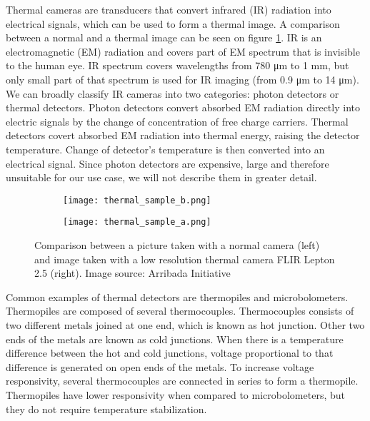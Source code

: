 Thermal cameras are transducers that convert infrared (IR) radiation into electrical signals, which can be used to form a thermal image.
A comparison between a normal and a thermal image can be seen on figure \ref{thermal_comparison}.
IR is an electromagnetic (EM) radiation and covers part of EM spectrum that is invisible to the human eye.
IR spectrum covers wavelengths from 780 \si{\micro\meter} to 1 \si{\milli\meter}, but only small part of that spectrum is used for IR imaging (from 0.9 \si{\micro\meter} to 14 \si{\micro\meter})\cite{thermal_book}.
We can broadly classify IR cameras into two categories: photon detectors or thermal detectors\cite{thermal_book}.
Photon detectors convert absorbed EM radiation directly into electric signals by the change of concentration of free charge carriers\cite{thermal_book}.
Thermal detectors covert absorbed EM radiation into thermal energy, raising the detector temperature\cite{thermal_book}. 
Change of detector's temperature is then converted into an electrical signal.
Since photon detectors are expensive, large and therefore unsuitable for our use case, we will not describe them in greater detail.

\begin{figure}[ht]
    \begin{subfigure}{0.5\textwidth}
        \centering
        \texttt{[image: thermal\_sample\_b.png]} 
    \end{subfigure}
    \begin{subfigure}{0.5\textwidth}
        \centering
        \texttt{[image: thermal\_sample\_a.png]}
    \end{subfigure}
    \caption{Comparison between a picture taken with a normal camera (left) and image taken with a low resolution thermal camera FLIR Lepton 2.5 (right). Image source: Arribada Initiative\cite{thermal_comparison}}
    \label{thermal_comparison}
\end{figure}

Common examples of thermal detectors are thermopiles and microbolometers. 
Thermopiles are composed of several thermocouples.
Thermocouples consists of two different metals joined at one end, which is known as hot junction.
Other two ends of the metals are known as cold junctions.
When there is a temperature difference between the hot and cold junctions, voltage proportional to that difference is generated on open ends of the metals.
To increase voltage responsivity, several thermocouples are connected in series to form a thermopile\cite{thermal_book}.
Thermopiles have lower responsivity when compared to microbolometers, but they do not require temperature stabilization\cite{thermal_book}.

